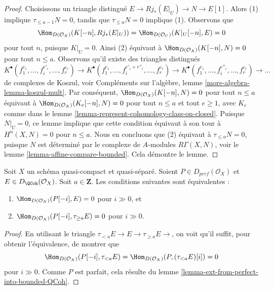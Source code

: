 \begin{proof}
Choisissons un triangle distingué $E \to Rj_*(E|_U) \to N \to E[1]$. Alors (1)
implique $\tau_{\leq a - 1}N = 0$, tandis que $\tau_{\leq a}N = 0$ implique (1).
Observons que
$$
\Hom_{D(\mathcal{O}_X)}(K[-n], Rj_*(E|_U)) =
\Hom_{D(\mathcal{O}_U)}(K|_U[-n], E) = 0
$$
pour tout $n$, puisque $K|_U = 0$. Ainsi (2) équivaut à
$\Hom_{D(\mathcal{O}_X)}(K[-n], N) = 0$ pour tout $n \leq a$. 
Observons qu'il existe des triangles distingués
$$
K^\bullet(f_1^{e_1}, \ldots, f_i^{e'_i}, \ldots, f_r^{e_r}) \to
K^\bullet(f_1^{e_1}, \ldots, f_i^{e'_i + e''_i}, \ldots, f_r^{e_r}) \to
K^\bullet(f_1^{e_1}, \ldots, f_i^{e''_i}, \ldots, f_r^{e_r}) \to \ldots
$$
de complexes de Koszul, voir
Compléments sur l'algèbre, lemme \ref{more-algebra-lemma-koszul-mult}. Par conséquent,
$\Hom_{D(\mathcal{O}_X)}(K[-n], N) = 0$ pour tout $n \leq a$
équivaut à
$\Hom_{D(\mathcal{O}_X)}(K_e[-n], N) = 0$ pour tout $n \leq a$ et tout $e \geq 1$,
avec $K_e$ comme dans le lemme \ref{lemma-represent-cohomology-class-on-closed}.
Puisque $N|_U = 0$, ce lemme implique que cette condition équivaut à son tour à
$H^n(X, N) = 0$ pour $n \leq a$. Nous en concluons que (2) équivaut à
$\tau_{\leq a}N = 0$, puisque $N$ est déterminé par le complexe de
$A$-modules $R\Gamma(X, N)$, voir le lemme \ref{lemma-affine-compare-bounded}.
Cela démontre le lemme.
\end{proof}

\begin{lemma}
\label{lemma-bounded-truncation}
Soit $X$ un schéma quasi-compact et quasi-séparé.
Soient $P \in D_{perf}(\mathcal{O}_X)$ et $E \in D_{\QCoh}(\mathcal{O}_X)$. 
Soit $a \in \mathbf{Z}$. Les conditions suivantes sont équivalentes :
\begin{enumerate}
\item $\Hom_{D(\mathcal{O}_X)}(P[-i], E) = 0$ pour $i \gg 0$, et
\item $\Hom_{D(\mathcal{O}_X)}(P[-i], \tau_{\geq a} E) = 0$ pour $i \gg 0$.
\end{enumerate}
\end{lemma}

\begin{proof}
En utilisant le triangle $ \tau_{< a} E \to E \to \tau_{\geq a} E \to$,
on voit qu'il suffit, pour obtenir l'équivalence, de montrer que
$$
\Hom_{D(\mathcal{O}_X)}(P[-i], \tau_{< a} E) =
\Hom_{D(\mathcal{O}_X)}(P, (\tau_{< a} E)[i]) = 0 
$$
pour $i \gg 0$. Comme $P$ est parfait, cela résulte du
lemme \ref{lemma-ext-from-perfect-into-bounded-QCoh}.
\end{proof}

